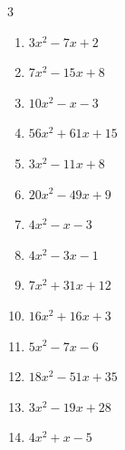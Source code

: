 \begin{multicols}{3}
\begin{enumerate}
        \phantom{$=(x-4)(4x-5)$}

  \item $3x^{2}-7x+2$

        \phantom{$=(x-2)(3x-1)$}

  \item $7x^{2}-15x+8$

        \phantom{$=(x-1)(7x-8)$}

  \item $10x^{2}-x-3$

        \phantom{$=(5x-3)(2x+1)$}

  \item $56x^{2}+61x+15$

        \phantom{$=(7x+5)(8x+3)$}

  \item $3x^{2}-11x+8$

        \phantom{$=(x-1)(3x-8)$}

  \item $20x^{2}-49x+9$

        \phantom{$=(5x-1)(4x-9)$}

  \item $4x^{2}-x-3$

        \phantom{$=(4x+3)(x-1)$}

\columnbreak %

  \item $4x^{2}-3x-1$

        \phantom{$=(4x+1)(x-1)$}

  \item $7x^{2}+31x+12$

        \phantom{$=(7x+3)(x+4)$}

  \item $16x^{2}+16x+3$

        \phantom{$=(4x+3)(4x+1)$}

  \item $5x^{2}-7x-6$

        \phantom{$=(x-2)(5x+3)$}

  \item $18x^{2}-51x+35$

        \phantom{$=(6x-7)(3x-5)$}

  \item $3x^{2}-19x+28$

        \phantom{$=(x-4)(3x-7)$}

  \item $4x^{2}+x-5$

        \phantom{$=(x-1)(4x+5)$}


\end{enumerate}
\end{multicols}
